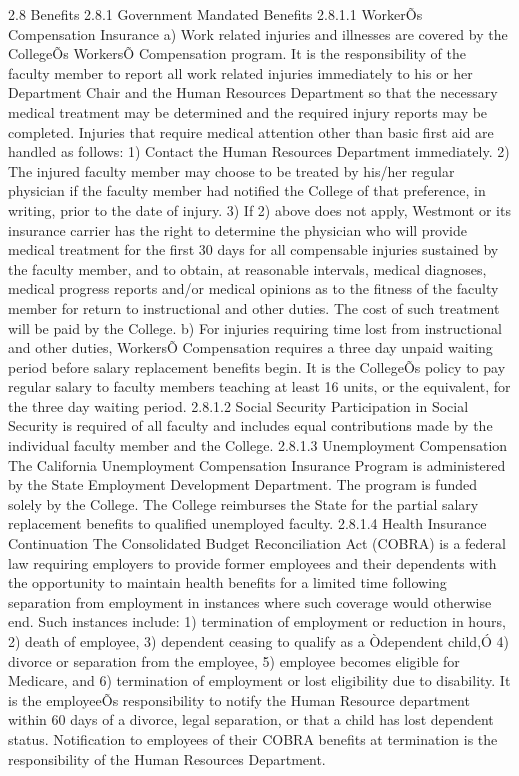 \documentclass[letterpaper, 11pt]{article}
\begin{document}
2.8 Benefits
2.8.1 Government Mandated Benefits
2.8.1.1 WorkerÕs Compensation Insurance
a) Work related injuries and illnesses are covered by the CollegeÕs WorkersÕ Compensation program.  It is the responsibility of the faculty member to report all work related injuries immediately to his or her Department Chair and the Human Resources Department so that the necessary medical treatment may be determined and the required injury reports may be completed. Injuries that require medical attention other than basic first aid are handled as follows:
1) Contact the Human Resources Department immediately.
2) The injured faculty member may choose to be treated by his/her regular physician if the faculty member had notified the College of that preference, in writing, prior to the date of injury.
3) If 2) above does not apply, Westmont or its insurance carrier has the right to determine the physician who will provide medical treatment for the first 30 days for all compensable injuries sustained by the faculty member, and to obtain, at reasonable intervals, medical diagnoses, medical progress reports and/or medical opinions as to the fitness of the faculty member for return to instructional and other duties.  The cost of such treatment will be paid by the College.
b) For injuries requiring time lost from instructional and other duties, WorkersÕ Compensation requires a three day unpaid waiting period before salary replacement benefits begin.  It is the CollegeÕs policy to pay regular salary to faculty members teaching at least 16 units, or the equivalent, for the three day waiting period.
2.8.1.2 Social Security
   Participation in Social Security is required of all faculty and includes equal contributions made by the individual faculty member and the College.
2.8.1.3 Unemployment Compensation
   The California Unemployment Compensation Insurance Program is administered by the State Employment Development Department.  The program is funded solely by the College. The College reimburses the State for the partial salary replacement benefits to qualified unemployed faculty.
2.8.1.4 Health Insurance Continuation
   The Consolidated Budget Reconciliation Act (COBRA) is a federal law requiring employers to provide former employees and their dependents with the opportunity to maintain health benefits for a limited time following separation from employment in instances where such coverage would otherwise end.  Such instances include:  1) termination of employment or reduction in hours, 2) death of employee, 3) dependent ceasing to qualify as a Òdependent child,Ó 4) divorce or separation from the employee, 5) employee becomes eligible for Medicare, and 6) termination of employment or lost eligibility due to disability.  It is the employeeÕs responsibility to notify the Human Resource department within 60 days of a divorce, legal separation, or that a child has lost dependent status.  Notification to employees of their COBRA benefits at termination is the responsibility of the Human Resources Department.
\end{document}
